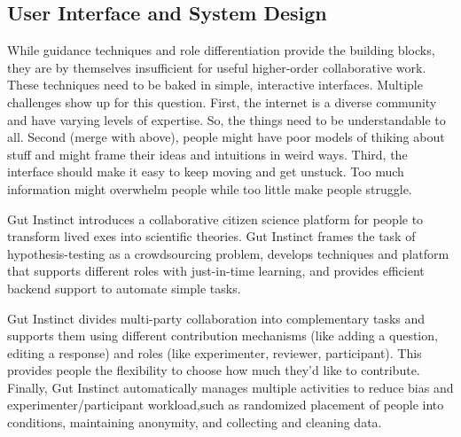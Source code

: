 \subsection{User Interface and System Design}

While guidance techniques and role differentiation provide the building blocks, they are by themselves insufficient for useful higher-order collaborative work. These techniques need to be baked in simple, interactive interfaces. Multiple challenges show up for this question. First, the internet is a diverse community and have varying levels of expertise. So, the things need to be understandable to all. Second (merge with above), people might have poor models of thiking about stuff and might frame their ideas and intuitions in weird ways. Third, the interface should make it easy to keep moving and get unstuck. Too much information might overwhelm people while too little make people struggle.

Gut Instinct  introduces a collaborative citizen science platform for people to transform lived exes into scientific theories. Gut Instinct frames the task of hypothesis-testing as a crowdsourcing problem, develops techniques and platform that supports different roles with just-in-time learning, and provides efficient backend support to automate simple tasks.

Gut Instinct divides multi-party collaboration into complementary tasks and supports them using different contribution mechanisms (like adding a question, editing a response) and roles (like experimenter, reviewer, participant). This provides people the flexibility to choose how much they’d like to contribute. Finally, Gut Instinct automatically manages multiple activities to reduce 
bias and experimenter/participant workload,such as randomized placement of 
people into conditions, maintaining anonymity, and collecting and cleaning data.


